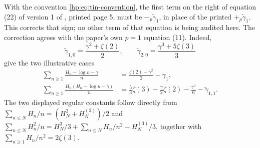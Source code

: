 With the convention \eqref{hp:eq:tin-convention}, the first term on
the right of equation (22) of version 1 of \cite{hp:Tin2025},
printed page 5, must be
$-{}_p\widetilde\gamma_1$, in place of the printed
$+{}_p\widetilde\gamma_1$. This corrects that sign; no other term
of that equation is being audited here. The correction agrees with
the paper's own $p=1$ equation (11). Indeed,
\[
 \widetilde\gamma_{1,0}=\frac{\gamma^2+\zeta(2)}2,
 \qquad
 \widetilde\gamma_{2,0}=\frac{\gamma^3+5\zeta(3)}3
\]
give the two illustrative cases
\begin{align}
 \sum_{n\ge1}\frac{H_n-\log n-\gamma}{n}
   &=\frac{\zeta(2)-\gamma^2}{2}-\gamma_1,
       \label{hp:eq:tin-pzero}\\
 \sum_{n\ge1}\frac{H_n(H_n-\log n-\gamma)}{n}
   &=\frac53\zeta(3)-\frac\gamma2\zeta(2)
       -\frac{\gamma^3}{6}-\widetilde\gamma_{1,1}.
       \label{hp:eq:tin-pone}
\end{align}
The two displayed regular constants follow directly from
$\sum_{n\le N}H_n/n=(H_N^2+H_N^{(2)})/2$ and
$\sum_{n\le N}H_n^2/n=H_N^3/3+
\sum_{n\le N}H_n/n^2-H_N^{(3)}/3$, together with
$\sum_{n\ge1}H_n/n^2=2\zeta(3)$.

